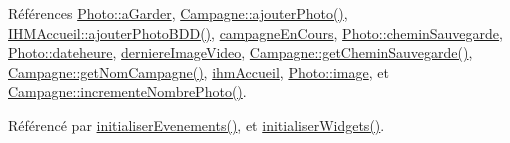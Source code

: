 Références \hyperlink{ihmalbumphoto_8h_source_l00024}{Photo\+::a\+Garder}, \hyperlink{campagne_8cpp_source_l00080}{Campagne\+::ajouter\+Photo()}, \hyperlink{ihmaccueil_8cpp_source_l00313}{I\+H\+M\+Accueil\+::ajouter\+Photo\+B\+D\+D()}, \hyperlink{ihmrov_8h_source_l00045}{campagne\+En\+Cours}, \hyperlink{ihmalbumphoto_8h_source_l00025}{Photo\+::chemin\+Sauvegarde}, \hyperlink{ihmalbumphoto_8h_source_l00023}{Photo\+::dateheure}, \hyperlink{ihmrov_8h_source_l00053}{derniere\+Image\+Video}, \hyperlink{campagne_8cpp_source_l00055}{Campagne\+::get\+Chemin\+Sauvegarde()}, \hyperlink{campagne_8cpp_source_l00019}{Campagne\+::get\+Nom\+Campagne()}, \hyperlink{ihmrov_8h_source_l00046}{ihm\+Accueil}, \hyperlink{ihmalbumphoto_8h_source_l00022}{Photo\+::image}, et \hyperlink{campagne_8cpp_source_l00105}{Campagne\+::incremente\+Nombre\+Photo()}.



Référencé par \hyperlink{ihmrov_8cpp_source_l00098}{initialiser\+Evenements()}, et \hyperlink{ihmrov_8cpp_source_l00033}{initialiser\+Widgets()}.


